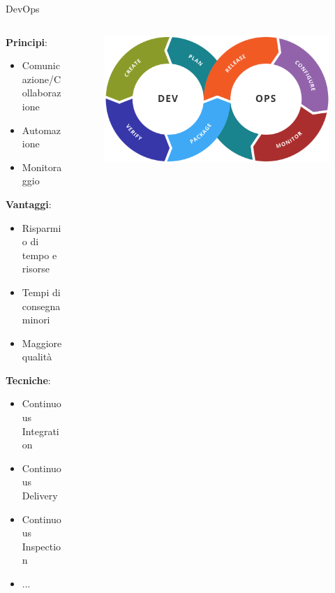 \begin{frame}{DevOps}
    \begin{columns}[onlytextwidth]
        \begin{column}{0.45\textwidth}
        
            \textbf{Principi}:
            \begin{itemize}
                \item Comunicazione/Collaborazione
                \item Automazione
                \item Monitoraggio
            \end{itemize}
            
            \vspace{3mm}
            
            \textbf{Vantaggi}:
            \begin{itemize}
                \item Risparmio di tempo e risorse
                \item Tempi di consegna minori
                \item Maggiore qualità
            \end{itemize}
            
            \vspace{3mm}
            
            \textbf{Tecniche}:
            \begin{itemize}
                \item Continuous Integration
                \item Continuous Delivery
                \item Continuous Inspection
                \item ...
            \end{itemize}
            
        \end{column}
        \begin{column}{0.55\textwidth}
        
             \begin{figure}[H]
                \includegraphics[width=1\textwidth]{img/Devops-toolchain.png}
            \end{figure}
            
        \end{column}
    \end{columns}
\end{frame}

